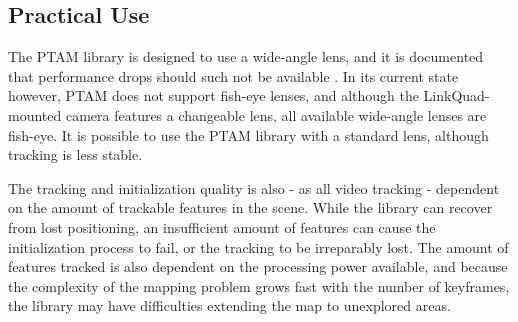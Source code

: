         \subsection{Practical Use}
            The PTAM library is designed to use a wide-angle lens, and it is
            documented that performance drops should such not be available \citep{klein07parallel}.
            In its current state however, PTAM does not support fish-eye lenses, and although
            the LinkQuad-mounted camera features a changeable lens, all
            available wide-angle lenses are fish-eye.
            It is possible to use the PTAM library with a standard lens, although
            tracking is less stable.

            The tracking and initialization quality is also - as all video tracking - dependent on the
            amount of trackable features in the scene.
            While the library can recover from lost positioning, an insufficient amount
            of features can cause the initialization process to fail, or the tracking to
            be irreparably lost.
            The amount of features tracked is also dependent on the processing
            power available, and because the complexity of the mapping
            problem grows fast with the number of keyframes, the library may
            have difficulties extending the map to unexplored areas.
